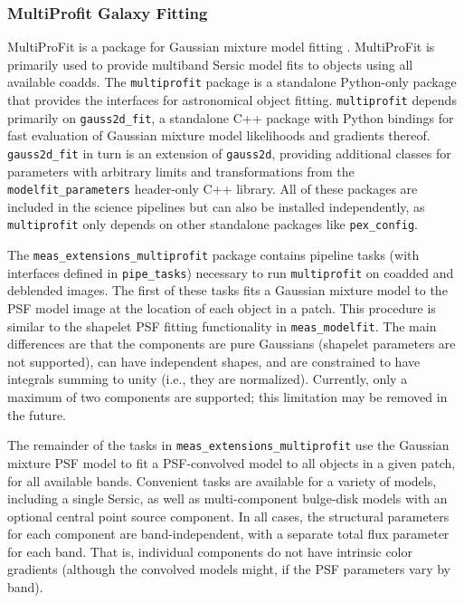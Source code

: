 \subsubsection{MultiProfit Galaxy Fitting}
\label{sec:multiprofit}

MultiProFit is a package for Gaussian mixture model fitting \citep{DMTN-312}.
MultiProFit is primarily used to provide multiband Sersic model fits to objects using all available coadds.
The \texttt{multiprofit} package is a standalone Python-only package that provides the interfaces for astronomical object fitting.
\texttt{multiprofit} depends primarily on \texttt{gauss2d\_fit}, a standalone C++ package with Python bindings for fast evaluation of Gaussian mixture model likelihoods and gradients thereof.
\texttt{gauss2d\_fit} in turn is an extension of \texttt{gauss2d}, providing additional classes for parameters with arbitrary limits and transformations from the \texttt{modelfit\_parameters} header-only C++ library.
All of these packages are included in the science pipelines but can also be installed independently, as \texttt{multiprofit} only depends on other standalone packages like \texttt{pex\_config}.

The \texttt{meas\_extensions\_multiprofit} package contains pipeline tasks (with interfaces defined in \texttt{pipe\_tasks}) necessary to run \texttt{multiprofit} on coadded and deblended images.
The first of these tasks fits a Gaussian mixture model to the PSF model image at the location of each object in a patch.
This procedure is similar to the shapelet PSF fitting functionality in \texttt{meas\_modelfit}.
The main differences are that the components are pure Gaussians (shapelet parameters are not supported), can have independent shapes, and are constrained to have integrals summing to unity (i.e., they are normalized).
Currently, only a maximum of two components are supported; this limitation may be removed in the future.

The remainder of the tasks in \texttt{meas\_\-extensions\_\-multiprofit} use the Gaussian mixture PSF model to fit a PSF-convolved model to all objects in a given patch, for all available bands.
Convenient tasks are available for a variety of models, including a single Sersic, as well as multi-component bulge-disk models with an optional central point source component.
In all cases, the structural parameters for each component are band-independent, with a separate total flux parameter for each band.
That is, individual components do not have intrinsic color gradients (although the convolved models might, if the PSF parameters vary by band).
